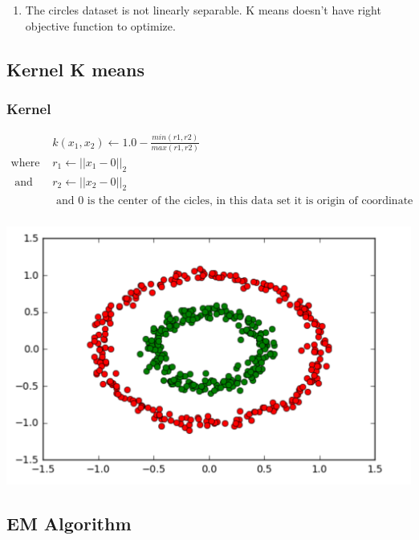 \documentclass[a4paper,doc,notimes]{article}
\begin{document}
\subsubsection{}
\begin{enumerate}
	\item The circles dataset is not linearly separable. K means doesn't have right objective function to optimize. 
\end{enumerate}

\subsection{Kernel K means}
\subsubsection{Kernel}

\begin{align*}
    & k(x_1, x_2) \leftarrow 1.0 - \frac{min(r1, r2)}{ max(r1, r2)} \\
    \text{where  } &  r_1 \leftarrow || x_1 - 0 ||_2  \\
    \text{ and } & r_2 \leftarrow || x_2 - 0 ||_2 \\
    & \text{ and $0$ is the center of the cicles, in this data set it is origin of coordinate system}
\end{align*}

\subsubsection{}
\includegraphics[scale=0.75]{images/kernel_kmeans.png}

\subsection{EM Algorithm}
\end{document}
